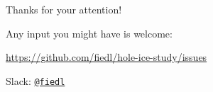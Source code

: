 
\begin{frame}{Thanks for your attention!}
  \begin{center}
    Any input you might have is welcome: \\ \vspace{0.3cm}

    \url{https://github.com/fiedl/hole-ice-study/issues} \\ \vspace{0.1cm}

    Slack: \href{https://icecube-spno.slack.com/messages/@U092MBFU2}{\texttt{@fiedl}}

  \end{center}
\end{frame}
